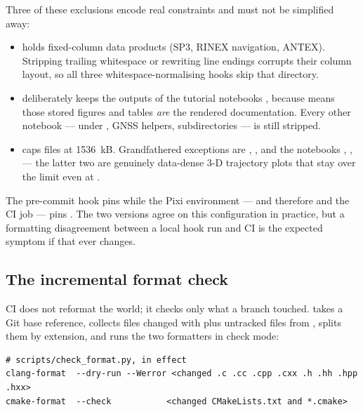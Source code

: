 Three of these exclusions encode real constraints and must not be simplified
away:

\begin{itemize}[leftmargin=1.4em]
  \item {} holds fixed-column data products (SP3,
    RINEX navigation, ANTEX). Stripping trailing whitespace or rewriting line
    endings corrupts their column layout, so all three whitespace-normalising
    hooks skip that directory.
  \item {} deliberately keeps the outputs of the tutorial
    notebooks , because
     means those stored figures and tables
    \emph{are} the rendered documentation. Every other notebook --- under
    , GNSS helpers, subdirectories --- is still stripped.
  \item {} caps files at 1536~kB.
    Grandfathered exceptions are ,
    , and the notebooks
    , ,
     --- the latter two are genuinely data-dense 3-D
    trajectory plots that stay over the limit even at .
\end{itemize}

\begin{lupntnote}
The pre-commit hook pins  while the Pixi
environment --- and therefore  and the CI
 job --- pins . The two versions agree on
this configuration in practice, but a formatting disagreement between a local
hook run and CI is the expected symptom if that ever changes.
\end{lupntnote}

\subsection{The incremental format check}

CI does not reformat the world; it checks only what a branch touched.
 takes a Git base reference, collects files
changed with  plus
untracked files from , splits
them by extension, and runs the two formatters in check mode:

\begin{lstlisting}[language=shell]
# scripts/check_format.py, in effect
clang-format  --dry-run --Werror <changed .c .cc .cpp .cxx .h .hh .hpp .hxx>
cmake-format  --check           <changed CMakeLists.txt and *.cmake>
\end{lstlisting}

